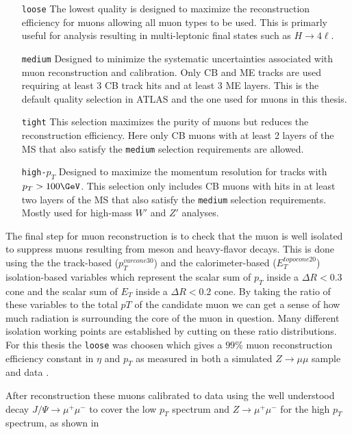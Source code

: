 \begin{enumerate}
  \item[\texttt{loose}] The lowest quality is designed to maximize the reconstruction efficiency for muons allowing all muon types to be used.  This is primarly useful for analysis resulting in multi-leptonic final states such as $H \rightarrow 4\ell$.
  \item[\texttt{medium}] Designed to minimize the systematic uncertainties associated with muon reconstruction and calibration.  Only CB and ME tracks are used requiring at least 3 CB track hits and at least 3 ME layers.  This is the default quality selection in ATLAS and the one used for muons in this thesis.
  \item[\texttt{tight}] This selection maximizes the purity of muons but reduces the reconstruction efficiency. Here only CB muons with at least 2 layers of the MS that also satisfy the \texttt{medium} selection requirements are allowed.
  \item[\texttt{high-$p_{T}$}] Designed to maximize the momentum resolution for tracks with $p_{T} > 100 \GeV$.  This selection only includes CB muons with hits in at least two layers of the MS that also satisfy the \texttt{medium} selection requirements.  Mostly used for high-mass $W'$ and $Z'$ analyses.
\end{enumerate}

The final step for muon reconstruction is to check that the muon is well
isolated to suppress muons resulting from meson and heavy-flavor decays. This
is done using the the track-based ($p_{T}^{varcone30}$) and the
calorimeter-based ($E_{T}^{topocone20}$) isolation-based variables which
represent the scalar sum of $p_{T}$ inside a $\Delta R < 0.3$ cone and the
scalar sum of $E_{T}$ inside a $\Delta R < 0.2$ cone.  By taking the ratio of
these variables to the total $p{T}$ of the candidate muon we can get a sense of
how much radiation is surrounding the core of the muon in question. Many
different isolation working points are established by cutting on these ratio
distributions. For this thesis the \texttt{loose} was choosen which gives a
$99\%$ muon reconstruction efficiency constant in $\eta$ and $p_{T}$ as
measured in both a simulated $Z \rightarrow \mu\mu$ sample and data \cite{Aad:2016jkr}.

After reconstruction these muons calibrated to data using the well understood
decay $J/\Psi \rightarrow \mu^{+}\mu^{-}$ to cover the low $p_{T}$ spectrum and
$Z \rightarrow \mu^{+}\mu^{-}$ for the high $p_{T}$ spectrum, as shown in 

